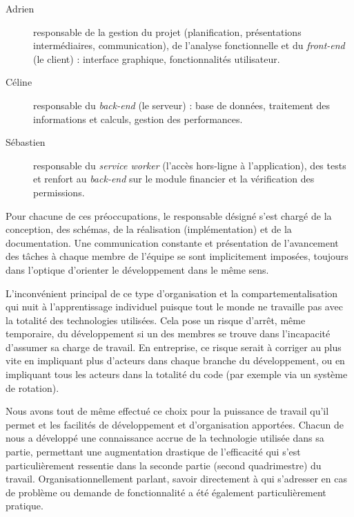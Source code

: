 \documentclass{EPL-master-thesis-covers-FR}
\begin{document}
				\begin{description}
					\item[Adrien] responsable de la gestion du projet (planification, présentations intermédiaires, communication), de l'analyse fonctionnelle et du \emph{front-end} (le client) : interface graphique, fonctionnalités utilisateur.

					\item[Céline] responsable du \emph{back-end} (le serveur) : base de données, traitement des informations et calculs, gestion des performances.

					\item[Sébastien] responsable du \emph{service worker} (l'accès hors-ligne à l'application), des tests et renfort au \emph{back-end} sur le module financier et la vérification des permissions.
				\end{description}

				Pour chacune de ces préoccupations, le responsable désigné s'est chargé de la conception, des schémas, de la réalisation (implémentation) et de la documentation. Une communication constante et présentation de l'avancement des tâches à chaque membre de l'équipe se sont implicitement imposées, toujours dans l'optique d'orienter le développement dans le même sens.

				L'inconvénient principal de ce type d'organisation et la compartementalisation qui nuit à l'apprentissage individuel puisque tout le monde ne travaille pas avec la totalité des technologies utilisées. Cela pose un risque d'arrêt, même temporaire, du développement si un des membres se trouve dans l'incapacité d'assumer sa charge de travail. En entreprise, ce risque serait à corriger au plus vite en impliquant plus d'acteurs dans chaque branche du développement, ou en impliquant tous les acteurs dans la totalité du code (par exemple via un système de rotation).

				Nous avons tout de même effectué ce choix pour la puissance de travail qu'il permet et les facilités de développement et d'organisation apportées. Chacun de nous a développé une connaissance accrue de la technologie utilisée dans sa partie, permettant une augmentation drastique de l'efficacité qui s'est particulièrement ressentie dans la seconde partie (second quadrimestre) du travail. Organisationnellement parlant, savoir directement à qui s'adresser en cas de problème ou demande de fonctionnalité a été également particulièrement pratique.
\end{document}
